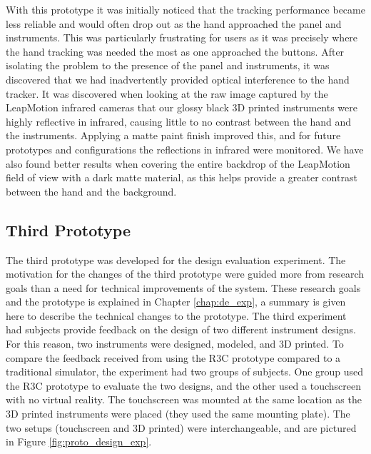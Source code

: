 
With this prototype it was initially noticed that the tracking performance became less reliable and would often drop out as the hand approached the panel and instruments.
This was particularly frustrating for users as it was precisely where the hand tracking was needed the most as one approached the buttons.
After isolating the problem to the presence of the panel and instruments, it was discovered that we had inadvertently provided optical interference to the hand tracker.
It was discovered when looking at the raw image captured by the LeapMotion infrared cameras that our glossy black 3D printed instruments were highly reflective in infrared, causing little to no contrast between the hand and the instruments.
Applying a matte paint finish improved this, and for future prototypes and configurations the reflections in infrared were monitored.
We have also found better results when covering the entire backdrop of the LeapMotion field of view with a dark matte material, as this helps provide a greater contrast between the hand and the background.


\subsection{Third Prototype}

The third prototype was developed for the design evaluation experiment.
The motivation for the changes of the third prototype were guided more from research goals than a need for technical improvements of the system.
These research goals and the prototype is explained in Chapter \ref{chap:de_exp}, a summary is given here to describe the technical changes to the prototype.
The third experiment had subjects provide feedback on the design of two different instrument designs.
For this reason, two instruments were designed, modeled, and 3D printed.
To compare the feedback received from using the R3C prototype compared to a traditional simulator, the experiment had two groups of subjects.
One group used the R3C prototype to evaluate the two designs, and the other used a touchscreen with no virtual reality.
The touchscreen was mounted at the same location as the 3D printed instruments were placed (they used the same mounting plate).
The two setups (touchscreen and 3D printed) were interchangeable, and are pictured in Figure \ref{fig:proto_design_exp}.

